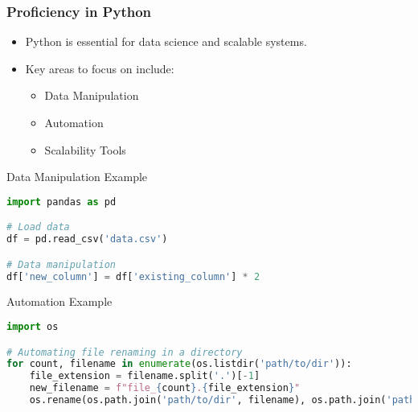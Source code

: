 \documentclass[aspectratio=169]{beamer}
\begin{document}
\begin{frame}[fragile]
  \frametitle{Proficiency in Python}
  \begin{itemize}
    \item Python is essential for data science and scalable systems.
    \item Key areas to focus on include:
      \begin{itemize}
        \item Data Manipulation
        \item Automation
        \item Scalability Tools
      \end{itemize}
  \end{itemize}
  
  \begin{block}{Data Manipulation Example}
    \begin{lstlisting}[language=Python]
import pandas as pd

# Load data
df = pd.read_csv('data.csv')

# Data manipulation
df['new_column'] = df['existing_column'] * 2
    \end{lstlisting}
  \end{block}
  
  \begin{block}{Automation Example}
    \begin{lstlisting}[language=Python]
import os

# Automating file renaming in a directory
for count, filename in enumerate(os.listdir('path/to/dir')):
    file_extension = filename.split('.')[-1]
    new_filename = f"file_{count}.{file_extension}"
    os.rename(os.path.join('path/to/dir', filename), os.path.join('path/to/dir', new_filename))
    \end{lstlisting}
  \end{block}
\end{frame}
\end{document}
